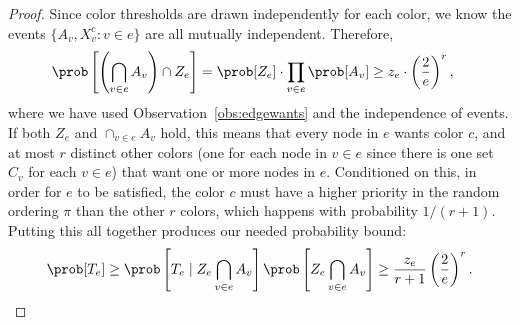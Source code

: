 \begin{proof}
Since color thresholds are drawn independently for each color, we know the events $\{A_v, X_v^c \colon v \in e\}$ are all mutually independent.
Therefore, 
\begin{align*}
    \prob\left[ \left(\bigcap_{v \in e} A_v \right) \cap Z_e\right ] &= \prob[Z_e]\cdot \prod_{v \in e} \prob[A_v] \geq z_e \cdot \left(\frac2e \right)^r,
\end{align*}
where we have used Observation~\ref{obs:edgewants} and the independence of events. If both $Z_e$ and $\cap_{v \in e} A_v$ hold, this means that every node in $e$ wants color $c$, and at most $r$ distinct other colors (one for each node in $v \in e$ since there is one set $C_v$ for each $v \in e$) that want one or more nodes in $e$. Conditioned on this, in order for $e$ to be satisfied, the color $c$ must have a higher priority in the random ordering $\pi$ than the other $r$ colors, which happens with probability $1/(r+1)$. Putting this all together produces our needed probability bound:
\begin{align*}
    \prob[T_e] \geq \prob\left[T_e \mid Z_e \bigcap_{v \in e} A_v\right] \prob\left[ Z_e \bigcap_{v \in e} A_v \right] \geq \frac{z_e}{r+1}\left(\frac2e\right)^r.
\end{align*}


\end{proof}